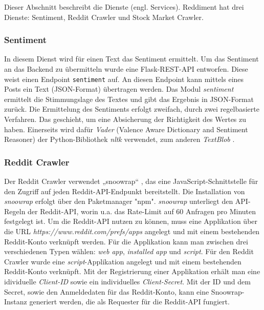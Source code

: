 \documentclass[a4paper, 10pt, conference]{IEEEtran}
\begin{document}
Dieser Abschnitt beschreibt die Dienste (engl. Services). Reddiment hat drei Dienste: Sentiment, Reddit Crawler und Stock Market Crawler.

\subsubsection{Sentiment}

In diesem Dienst wird für einen Text das Sentiment ermittelt. Um das Sentiment an das Backend zu übermitteln wurde eine Flask-REST-API entworfen. Diese weist einen Endpoint \texttt{\/sentiment} auf. An diesen Endpoint kann mittels eines Posts ein Text (JSON-Format) übertragen werden. Das Modul \textit{sentiment} ermittelt die Stimmungslage des Textes und gibt das Ergebnis in JSON-Format zurück. Die Ermittelung des Sentiments erfolgt zweifach, durch zwei regelbasierte Verfahren.  Das geschieht, um eine Absicherung der Richtigkeit des Wertes zu haben. Einerseits wird dafür \textit{Vader} \cite{vader}(Valence Aware Dictionary and Sentiment Reasoner) der Python-Bibliothek \textit{nltk} verwendet, zum anderen \textit{TextBlob} \cite{textblob}.

\subsubsection{Reddit Crawler}

Der Reddit Crawler verwendet „snoowrap“ \cite{snoowrap}, das eine JavaScript-Schnittstelle für den Zugriff auf jeden Reddit-API-Endpunkt bereitstellt. Die Installation von \textit{snoowrap} erfolgt über den Paketmanager "npm". \textit{snoowrap} unterliegt den API-Regeln der Reddit-API, worin u.a. das Rate-Limit auf 60 Anfragen pro Minuten festgelegt ist. Um die Reddit-API nutzen zu können, muss eine Applikation über die URL \textit{https://www.reddit.com/prefs/apps} angelegt und mit einem bestehenden Reddit-Konto verknüpft werden. Für die Applikation kann man zwischen drei verschiedenen Typen wählen: \textit{web app}, \textit{installed app} und \textit{script}. Für den Reddit Crawler wurde eine \textit{script}-Applikation angelegt und mit einem bestehenden Reddit-Konto verknüpft. Mit der Registrierung einer Applikation erhält man eine idividuelle \textit{Client-ID} sowie ein individuelles \textit{Client-Secret}. Mit der ID und dem Secret, sowie den Anmeldedaten für das Reddit-Konto, kann eine Snoowrap-Instanz generiert werden, die als Requester für die Reddit-API fungiert.\\
\end{document}
